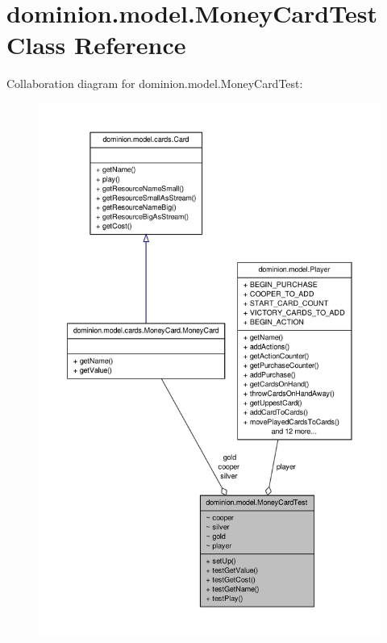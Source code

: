 \hypertarget{classdominion_1_1model_1_1MoneyCardTest}{\section{dominion.\-model.\-Money\-Card\-Test \-Class \-Reference}
\label{classdominion_1_1model_1_1MoneyCardTest}
}


\-Collaboration diagram for dominion.\-model.\-Money\-Card\-Test\-:
\nopagebreak
\begin{figure}[H]
\begin{center}
\leavevmode
\includegraphics[width=350pt]{classdominion_1_1model_1_1MoneyCardTest__coll__graph}
\end{center}
\end{figure}
